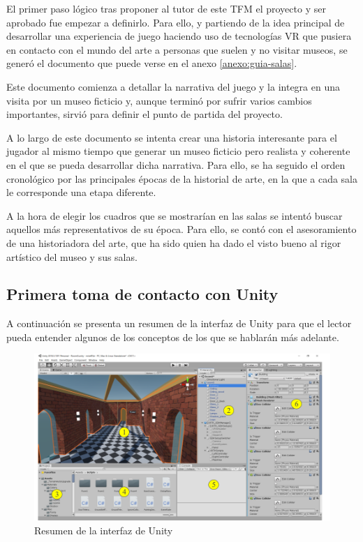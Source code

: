 El primer paso lógico tras proponer al tutor de este \acs{TFM} el proyecto y ser aprobado fue empezar a definirlo. Para ello, y partiendo de la idea principal de desarrollar una experiencia de juego haciendo uso de tecnologías \acs{VR} que pusiera en contacto con el mundo del arte a personas que suelen y no visitar museos, se generó el documento que puede verse en el anexo \ref{anexo:guia-salas}. 

Este documento comienza a detallar la narrativa del juego y la integra en una visita por un museo ficticio y, aunque terminó por sufrir varios cambios importantes, sirvió para definir el punto de partida del proyecto.

A lo largo de este documento se intenta crear una historia interesante para el jugador al mismo tiempo que generar un museo ficticio pero realista y coherente en el que se pueda desarrollar dicha narrativa. Para ello, se ha seguido el orden cronológico por las principales épocas de la historial de arte, en la que a cada sala le corresponde una etapa diferente.

A la hora de elegir los cuadros que se mostrarían en las salas se intentó buscar aquellos más representativos de su época. Para ello, se contó con el asesoramiento de una historiadora del arte, que ha sido quien ha dado el visto bueno al rigor artístico del museo y sus salas.

\subsection{Primera toma de contacto con Unity}

A continuación se presenta un resumen de la interfaz de Unity para que el lector pueda entender algunos de los conceptos de los que se hablarán más adelante.

\begin{figure}[!h]
\begin{center}
\includegraphics[width=1\textwidth]{imagenes/7/interfaz-unity.png}
\caption{Resumen de la interfaz de Unity}
\label{fig:interfaz-unity}
\end{center}
\end{figure}

